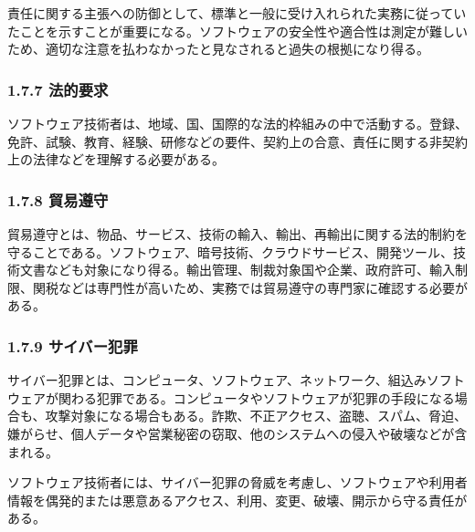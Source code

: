 \documentclass[uplatex,dvipdfmx,a4paper,11pt]{jsarticle}
\begin{document}
責任に関する主張への防御として、標準と一般に受け入れられた実務に従っていたことを示すことが重要になる。ソフトウェアの安全性や適合性は測定が難しいため、適切な注意を払わなかったと見なされると過失の根拠になり得る。

\subsubsection*{1.7.7 法的要求}


ソフトウェア技術者は、地域、国、国際的な法的枠組みの中で活動する。登録、免許、試験、教育、経験、研修などの要件、契約上の合意、責任に関する非契約上の法律などを理解する必要がある。

\subsubsection*{1.7.8 貿易遵守}


貿易遵守とは、物品、サービス、技術の輸入、輸出、再輸出に関する法的制約を守ることである。ソフトウェア、暗号技術、クラウドサービス、開発ツール、技術文書なども対象になり得る。輸出管理、制裁対象国や企業、政府許可、輸入制限、関税などは専門性が高いため、実務では貿易遵守の専門家に確認する必要がある。

\subsubsection*{1.7.9 サイバー犯罪}


サイバー犯罪とは、コンピュータ、ソフトウェア、ネットワーク、組込みソフトウェアが関わる犯罪である。コンピュータやソフトウェアが犯罪の手段になる場合も、攻撃対象になる場合もある。詐欺、不正アクセス、盗聴、スパム、脅迫、嫌がらせ、個人データや営業秘密の窃取、他のシステムへの侵入や破壊などが含まれる。

ソフトウェア技術者には、サイバー犯罪の脅威を考慮し、ソフトウェアや利用者情報を偶発的または悪意あるアクセス、利用、変更、破壊、開示から守る責任がある。

\begin{center}
\end{center}
\end{document}
